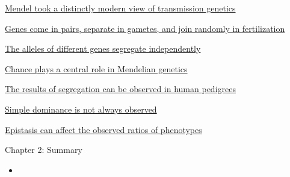\documentclass[12pt,letterpaper]{article}
\begin{document}
\hypertarget{2.1}{}
\begin{secbox}{\hyperlink{2}{Mendel took a distinctly modern view of transmission genetics}}{

}\end{secbox}
\hypertarget{2.2}{}
\begin{secbox}{\hyperlink{2}{Genes come in pairs, separate in gametes, and join randomly in fertilization}}{

}\end{secbox}
\hypertarget{2.3}{}
\begin{secbox}{\hyperlink{2}{The alleles of different genes segregate independently}}{

}\end{secbox}
\hypertarget{2.4}{}
\begin{secbox}{\hyperlink{2}{Chance plays a central role in Mendelian genetics}}{

}\end{secbox}
\hypertarget{2.5}{}
\begin{secbox}{\hyperlink{2}{The results of segregation can be observed in human pedigrees}}{

}\end{secbox}
\hypertarget{2.6}{}
\begin{secbox}{\hyperlink{2}{Simple dominance is not always observed}}{

}\end{secbox}
\hypertarget{2.7}{}
\begin{secbox}{\hyperlink{2}{Epistasis can affect the observed ratios of phenotypes}}{

}\end{secbox}

\begin{probbox}{Chapter 2: Summary}{
    \begin{itemize}
        \item
    \end{itemize}
}\end{probbox}



\clearpage
\end{document}
